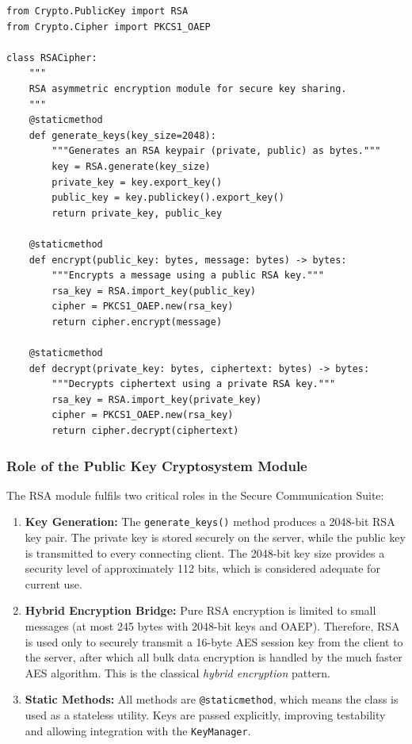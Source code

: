 \documentclass[12pt,a4paper]{article}
\begin{document}
\begin{lstlisting}[caption={RSA Public Key Module – \texttt{public\_key.py}}]
from Crypto.PublicKey import RSA
from Crypto.Cipher import PKCS1_OAEP

class RSACipher:
    """
    RSA asymmetric encryption module for secure key sharing.
    """
    @staticmethod
    def generate_keys(key_size=2048):
        """Generates an RSA keypair (private, public) as bytes."""
        key = RSA.generate(key_size)
        private_key = key.export_key()
        public_key = key.publickey().export_key()
        return private_key, public_key

    @staticmethod
    def encrypt(public_key: bytes, message: bytes) -> bytes:
        """Encrypts a message using a public RSA key."""
        rsa_key = RSA.import_key(public_key)
        cipher = PKCS1_OAEP.new(rsa_key)
        return cipher.encrypt(message)

    @staticmethod
    def decrypt(private_key: bytes, ciphertext: bytes) -> bytes:
        """Decrypts ciphertext using a private RSA key."""
        rsa_key = RSA.import_key(private_key)
        cipher = PKCS1_OAEP.new(rsa_key)
        return cipher.decrypt(ciphertext)
\end{lstlisting}

\subsubsection{Role of the Public Key Cryptosystem Module}

The RSA module fulfils two critical roles in the Secure Communication Suite:

\begin{enumerate}
    \item \textbf{Key Generation:} The \texttt{generate\_keys()} method produces a 2048-bit RSA key pair. The private key is stored securely on the server, while the public key is transmitted to every connecting client. The 2048-bit key size provides a security level of approximately 112 bits, which is considered adequate for current use.
    
    \item \textbf{Hybrid Encryption Bridge:} Pure RSA encryption is limited to small messages (at most 245 bytes with 2048-bit keys and OAEP). Therefore, RSA is used only to securely transmit a 16-byte AES session key from the client to the server, after which all bulk data encryption is handled by the much faster AES algorithm. This is the classical \emph{hybrid encryption} pattern.
    
    \item \textbf{Static Methods:} All methods are \texttt{@staticmethod}, which means the class is used as a stateless utility. Keys are passed explicitly, improving testability and allowing integration with the \texttt{KeyManager}.
\end{enumerate}
\end{document}
